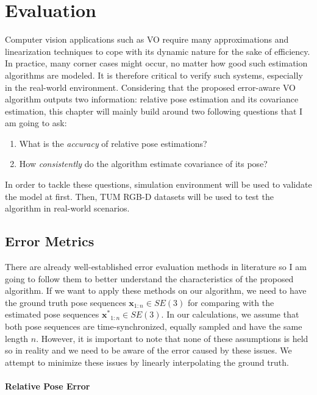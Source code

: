 \documentclass[12pt]{report}
\numberwithin{figure}{section}
\begin{document}
\chapter{Evaluation} \label{cp_evaluation}

Computer vision applications such as VO require many approximations and 
linearization techniques to cope with its dynamic nature for the sake of 
efficiency.  In practice, many corner cases might occur, no matter how good 
such estimation algorithms are modeled. It is therefore critical to verify 
such systems, especially in the real-world environment.  Considering that the 
proposed error-aware VO algorithm outputs two information: relative pose 
estimation and its covariance estimation, this chapter will mainly build 
around two following questions that I am going to ask:

\begin{enumerate} \item What is the \textit{accuracy} of relative pose 
estimations?  \item How \textit{consistently} do the algorithm estimate 
covariance of its pose?  \end{enumerate}

In order to tackle these questions, simulation environment will be used to validate the model at first. Then, TUM RGB-D datasets will be used to test the algorithm in real-world scenarios.

\section{Error Metrics}

There are already well-established error evaluation methods in literature so I am going to follow them to better understand the characteristics of the proposed algorithm.  If we want to apply these methods on our algorithm, we need to have the ground truth pose sequences $\mathbf{x}_{1:n} \in SE(3)$ for comparing with the estimated pose sequences $\mathbf{x^*}_{1:n} \in SE(3)$.  In our calculations, we assume that both pose sequences are time-synchronized, equally sampled and have the same length $n$.  However, it is important to note that none of these assumptions is held so in reality and we need to be aware of the error caused by these issues.  We attempt to minimize these issues by linearly interpolating the ground truth.


\subsubsection{Relative Pose Error}
\end{document}
